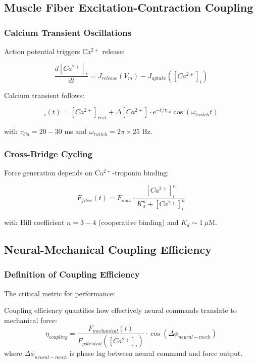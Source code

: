 \subsection{Muscle Fiber Excitation-Contraction Coupling}

\subsubsection{Calcium Transient Oscillations}

Action potential triggers Ca$^{2+}$ release:

\begin{equation}
\frac{d[Ca^{2+}]_{i}}{dt} = J_{release}(V_m) - J_{uptake}([Ca^{2+}]_i)
\label{eq:calcium_transient}
\end{equation}

Calcium transient follows:

\begin{equation}
[Ca^{2+}]_i(t) = [Ca^{2+}]_{rest} + \Delta[Ca^{2+}] \cdot e^{-t/\tau_{Ca}} \cos(\omega_{twitch} t)
\label{eq:ca_transient_profile}
\end{equation}

with $\tau_{Ca} = 20-30$ ms and $\omega_{twitch} = 2\pi \times 25$ Hz.

\subsubsection{Cross-Bridge Cycling}

Force generation depends on Ca$^{2+}$-troponin binding:

\begin{equation}
F_{fiber}(t) = F_{max} \cdot \frac{[Ca^{2+}]_i^n}{K_d^n + [Ca^{2+}]_i^n}
\label{eq:calcium_force}
\end{equation}

with Hill coefficient $n = 3-4$ (cooperative binding) and $K_d \sim 1~\mu$M.

\subsection{Neural-Mechanical Coupling Efficiency}

\subsubsection{Definition of Coupling Efficiency}

The critical metric for performance:

\begin{definition}
Coupling efficiency quantifies how effectively neural commands translate to mechanical force:
\begin{equation}
\eta_{coupling} = \frac{F_{mechanical}(t)}{F_{potential}([Ca^{2+}]_i)} \cdot \cos(\Delta\phi_{neural-mech})
\label{eq:coupling_efficiency}
\end{equation}
where $\Delta\phi_{neural-mech}$ is phase lag between neural command and force output.
\end{definition}


